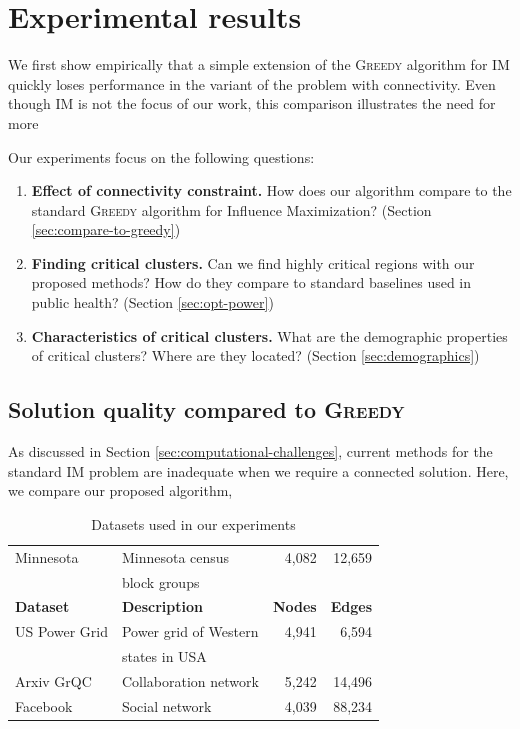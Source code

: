 \section{Experimental results}
\label{sec:experiments-cs}
We first show empirically that a simple extension of the \textsc{Greedy} algorithm for IM quickly loses performance in the variant of the problem with connectivity. Even though IM is not the focus of our work, this comparison illustrates the need for more 

Our experiments focus on the following questions:
\begin{enumerate}
\item \textbf{Effect of connectivity constraint.} How does our algorithm compare to the standard \textsc{Greedy} algorithm for Influence Maximization? (Section \ref{sec:compare-to-greedy})
\item \textbf{Finding critical clusters.} Can we find highly critical regions with our proposed methods? How do they compare to standard baselines used in public health? (Section \ref{sec:opt-power})
\item \textbf{Characteristics of critical clusters.} What are the demographic properties of critical clusters? Where are they located? (Section \ref{sec:demographics})
\end{enumerate}

\subsection{Solution quality compared to \textsc{Greedy}}
As discussed in Section \ref{sec:computational-challenges}, current methods for the standard IM problem are inadequate when we require a connected solution. Here, we compare our proposed algorithm, \algomaxcrit{}

\label{sec:compare-to-greedy}
\begin{table}[ht]
\centering \caption{Datasets used in our experiments}
\label{table:datasets}
\begin{tabular}{|l|l|r|r|}
\hline
Minnesota  & Minnesota census & 4,082 & 12,659 \\
& block groups & & \\
\hline
\textbf{Dataset}  & \textbf{Description} & \textbf{Nodes} & \textbf{Edges} \\
\hline
US Power Grid & Power grid of Western  & 	4,941 & 6,594\\
& states in USA & & \\
\hline
Arxiv GrQC & Collaboration network & 5,242 & 14,496 \\
\hline
Facebook  & Social network & 4,039 & 88,234\\
\hline
\end{tabular}
\end{table}

